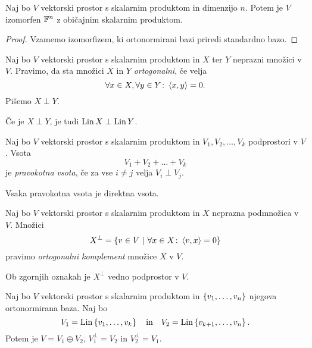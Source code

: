 \documentclass[12pt, a4paper]{article}
\begin{document}
\begin{izrek}
Naj bo $V$ vektorski prostor s skalarnim produktom in dimenzijo $n$. Potem je $V$ izomorfen $\mathbb{F}^n$ z običajnim skalarnim produktom.
\end{izrek}

\begin{proof}
Vzamemo izomorfizem, ki ortonormirani bazi priredi standardno bazo.
\end{proof}

\begin{definicija}
Naj bo $V$ vektorski prostor s  skalarnim produktom in $X$ ter $Y$ neprazni množici v $V$. Pravimo, da sta množici $X$ in $Y$ \emph{ortogonalni}, če velja
\[
\forall x\in X,\forall y\in Y\colon \left\langle x,y\right\rangle=0.
\]
Pišemo $X\perp Y$.
\end{definicija}

\begin{trditev}
Če je $X\perp Y$, je tudi $\operatorname{Lin} X\perp\operatorname{Lin} Y$.
\end{trditev}

\obvs

\begin{definicija}
Naj bo $V$ vektorski prostor s skalarnim produktom in $V_1,V_2,\dots,V_k$ podprostori v $V$. Vsota
\[
V_1+V_2+\dots+V_k
\]
je \emph{pravokotna vsota}, če za vse $i\ne j$ velja $V_i\perp V_j$.
\end{definicija}

\begin{trditev}
Vsaka pravokotna vsota je direktna vsota.
\end{trditev}

\obvs

\begin{definicija}
Naj bo $V$ vektorski prostor s skalarnim produktom in $X$ neprazna podmnožica v $V$. Množici
\[
X^\bot=\left\{v\in V~\middle\vert~\forall x\in X\colon\left\langle v,x\right\rangle=0\right\}
\]
pravimo \emph{ortogonalni komplement} množice $X$ v $V$.
\end{definicija}

\begin{trditev}
Ob zgornjih oznakah je $X^\bot$ vedno podprostor v $V$.
\end{trditev}

\obvs

\begin{trditev}\label{td:ortg}
Naj bo $V$ vektorski prostor s skalarnim produktom in $\left\{v_1,\dots,v_n\right\}$ njegova ortonormirana baza. Naj bo
\[
V_1=\operatorname{Lin}\left\{v_1,\dots,v_k\right\}\quad\text{in}\quad V_2=\operatorname{Lin}\left\{v_{k+1},\dots,v_n\right\}.
\]
Potem je $V=V_1\oplus V_2$, $V_1^\bot=V_2$ in $V_2^\bot=V_1$.
\end{trditev}
\end{document}
